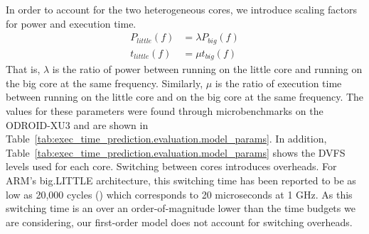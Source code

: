 In order to account for the two heterogeneous cores, we introduce scaling
factors for power and execution time.
\begin{align*}
  P_{little}(f) &= \lambda P_{big}(f) \\
  t_{little}(f) &= \mu t_{big}(f)
\end{align*}
That is, $\lambda$ is the ratio of power between running on the little core and
running on the big core at the same frequency. Similarly, $\mu$ is the ratio
of execution time between running on the little core and on the big core at the
same frequency. The values for these parameters were found through
microbenchmarks on the ODROID-XU3 and are shown in
Table~\ref{tab:exec_time_prediction.evaluation.model_params}. In addition,
Table~\ref{tab:exec_time_prediction.evaluation.model_params} shows the DVFS
levels used for each core. Switching between cores introduces overheads. For
ARM's big.LITTLE architecture, this switching time has been reported to be as
low as 20,000 cycles (\cite{cho-12}) which corresponds to 20 microseconds at 1
GHz. As this switching time is an over an order-of-magnitude lower than the
time budgets we are considering, our first-order model does not account for
switching overheads.

